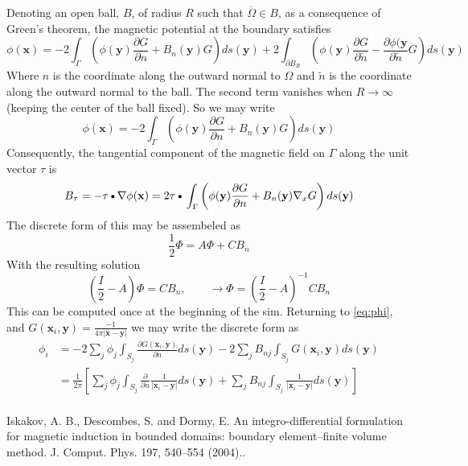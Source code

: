 \documentclass[11pt]{article}
\newcommand{\myBullet}{\text{\textbullet}}
\begin{document}
Denoting an open ball, $B$, of radius $R$ such that $\overline{\Omega}\in B$, as a consequence of Green's theorem, the magnetic potential at the boundary satisfies
\begin{equation}
  \phi(\mathbf{x}) = 
  -2 \int_{\Gamma} \left( \phi(\mathbf{y})
  \frac{\partial G}{\partial n} + B_n(\mathbf{y}) G \right) ds(\mathbf{y})
  +2 \int_{\partial B_R} \left( \phi(\mathbf{y})
  \frac{\partial G}{\partial \tilde{n}} - \frac{\partial \phi(\mathbf{y}}{\partial \tilde{n}} G \right) ds(\mathbf{y})
\end{equation}
Where $n$ is the coordinate along the outward normal to $\Omega$ and $\tilde{n}$ is the coordinate along the outward normal to the ball. The second term vanishes when $R\rightarrow \infty$ (keeping the center of the ball fixed). So we may write
\begin{equation} \label{eq:phi}
  \phi(\mathbf{x}) = 
  -2 \int_{\Gamma} \left( \phi(\mathbf{y})
  \frac{\partial G}{\partial n} + B_n(\mathbf{y}) G \right) ds(\mathbf{y})
\end{equation}
Consequently, the tangential component of the magnetic field on $\Gamma$ along the unit vector $\tau$ is 
\begin{equation}
  B_{\tau} = - \mathbf{\tau} \myBullet \nabla \phi(\mathbf{x}) = 
  2 \mathbf{\tau} \myBullet
  \int_{\Gamma}
  \left(
  \phi(\mathbf{y}) \frac{\partial G}{\partial n}
  + B_n(\mathbf{y}) \nabla_x G
  \right) ds(\mathbf{y})
\end{equation}
The discrete form of this may be assembeled as 
\begin{equation}
  \frac{1}{2} \Phi = A \Phi + C B_n
\end{equation}
With the resulting solution
\begin{equation}
  \left(\frac{I}{2} - A\right)\Phi = C B_n, \qquad
  \rightarrow
  \Phi = \left(\frac{I}{2} - A\right)^{-1} C B_n
\end{equation}
This can be computed once at the beginning of the sim. Returning to \ref{eq:phi}, and $G(\mathbf{x}_i,\mathbf{y}) = \frac{-1}{4\pi |\mathbf{x} - \mathbf{y}|}$ we may write the discrete form as
\begin{equation}
\begin{split}
\phi_i & = -2 \sum_j \phi_j \int_{S_j} \frac{\partial G(\mathbf{x}_i,\mathbf{y})}{\partial n} ds(\mathbf{y})
           -2 \sum_j B_{nj} \int_{S_j} G(\mathbf{x}_i,\mathbf{y}) ds(\mathbf{y}) \\
       & = \frac{1}{2 \pi} 
       \left[
       \sum_j \phi_j \int_{S_j} \frac{\partial}{\partial n} \frac{1}{|\mathbf{x}_i-\mathbf{y}|} ds(\mathbf{y})
     + \sum_j B_{nj} \int_{S_j} \frac{1}{|\mathbf{x}_i-\mathbf{y}|} ds(\mathbf{y})
       \right] \\
\end{split}
\end{equation}


\begin{thebibliography}{1}
 Iskakov, A. B., Descombes, S. and Dormy, E. An integro-differential formulation for magnetic induction in bounded domains: boundary element–finite volume method. J. Comput. Phys. 197, 540–554 (2004)..
\end{thebibliography}
\end{document}
